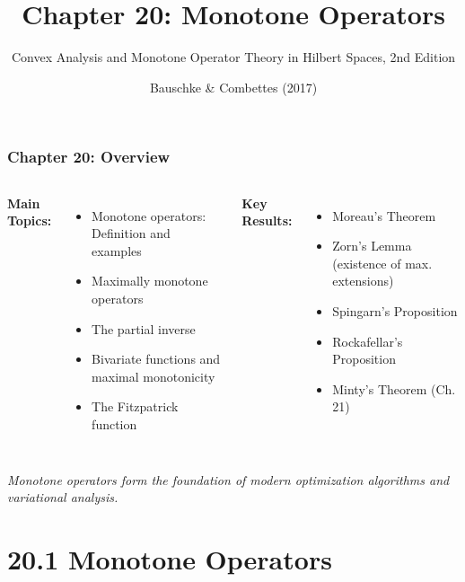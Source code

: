 \documentclass[aspectratio=169,10pt]{beamer}
\title{Chapter 20: Monotone Operators}
\subtitle{Convex Analysis and Monotone Operator Theory in Hilbert Spaces, 2nd Edition}
\author{Bauschke \& Combettes (2017)}
\date{}
\institute{Based on Convex Analysis and Monotone Operator Theory}
\begin{document}
\frame{\titlepage}

\begin{frame}
    \frametitle{Chapter 20: Overview}

    \begin{columns}[T]
        \textbf{Main Topics:}
        \begin{itemize}
            \item[\textcolor{blue}{\(\checkmark\)}] Monotone operators: Definition and examples
            \item[\textcolor{blue}{\(\checkmark\)}] Maximally monotone operators
            \item[\textcolor{blue}{\(\checkmark\)}] The partial inverse
            \item[\textcolor{blue}{\(\checkmark\)}] Bivariate functions and maximal monotonicity
            \item[\textcolor{blue}{\(\checkmark\)}] The Fitzpatrick function
        \end{itemize}

        \textbf{Key Results:}
        \begin{itemize}
            \item Moreau's Theorem
            \item Zorn's Lemma (existence of max. extensions)
            \item Spingarn's Proposition
            \item Rockafellar's Proposition
            \item Minty's Theorem (Ch. 21)
        \end{itemize}
    \end{columns}

    \vspace{2em}
    \centering
    \textit{Monotone operators form the foundation of modern optimization algorithms and variational analysis.}
\end{frame}

\section{20.1 Monotone Operators}
\end{document}

